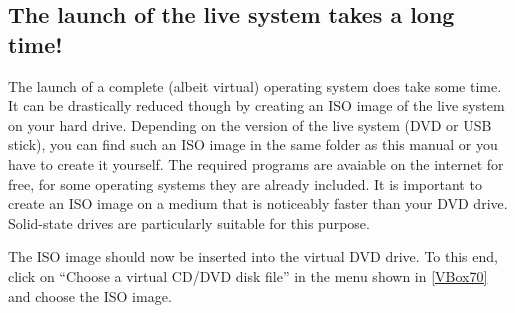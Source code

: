 \documentclass[a4paper,10pt,BCOR=0mm,DIV=14]{scrartcl}
\newcommand{\command}[1]{\textsf{\enquote{#1}}}
\begin{document}
\subsection{The launch of the live system takes a long time!}
The launch of a complete (albeit virtual) operating system does take some time. It can be drastically reduced though by creating an ISO image of the live system on your hard drive. Depending on the version of the live system (DVD or USB stick), you can find such an ISO image in the same folder as this manual or you have to create it yourself. The required programs are avaiable on the internet for free, for some operating systems they are already included. It is important to create an ISO image on a medium that is noticeably faster than your DVD drive. Solid-state drives are particularly suitable for this purpose. 

The ISO image should now be inserted into the virtual DVD drive. To this end, click on \command{Choose a virtual CD/DVD disk file} in the menu shown in \cref{VBox70} and choose the ISO image. 
\end{document}

